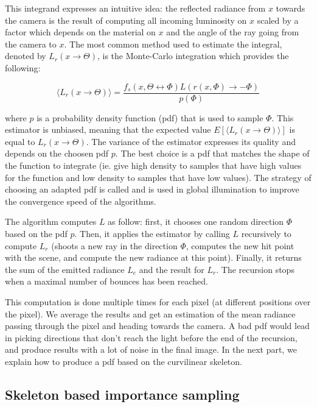 This integrand expresses an intuitive idea: the reflected radiance from $x$ towards the camera is the result of computing all incoming luminosity on $x$ scaled by a factor which depends on the material on $x$ and the angle of the ray going from the camera to $x$. The most common method used to estimate the integral, denoted by $L_r(x \rightarrow \Theta)$, is the Monte-Carlo integration which provides the following:

\begin{equation*}
\langle L_r(x \rightarrow \Theta) \rangle = \frac{f_s(x, \Theta \leftrightarrow \Phi) L(r(x, \Phi) \rightarrow -\Phi)}{p(\Phi)}
\end{equation*}

where $p$ is a probability density function (pdf) that is used to sample $\Phi$. This estimator is unbiased, meaning that the expected value $E[\langle L_r(x \rightarrow \Theta) \rangle]$ is equal to $L_r(x \rightarrow \Theta)$. The variance of the estimator expresses its quality and depends on the choosen pdf $p$. The best choice is a pdf that matches the shape of the function to integrate (ie. give high density to samples that have high values for the function and low density to samples that have low values).
The strategy of choosing an adapted pdf is called  and is used in global illumination to improve the convergence speed of the algorithms.

The algorithm computes $L$ as follow: first, it chooses one random direction $\Phi$ based on the pdf $p$. Then, it applies the estimator by calling $L$ recursively to compute $L_r$ (shoots a new ray in the direction $\Phi$, computes the new hit point with the scene, and compute the new radiance at this point). Finally, it returns the sum of the emitted radiance $L_e$ and the result for $L_r$. The recursion stops when a maximal number of bounces has been reached.

This computation is done multiple times for each pixel (at different positions over the pixel). We average the results and get an estimation of the mean radiance passing through the pixel and heading towards the camera.
A bad pdf would lead in picking directions that don't reach the light before the end of the recursion, and produce results with a lot of noise in the final image. In the next part, we explain how to produce a pdf based on the curvilinear skeleton.



\subsection{Skeleton based importance sampling}

